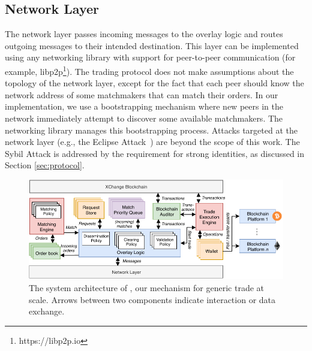 \subsection{Network Layer}
\label{subsec:network_layer}
The network layer passes incoming messages to the overlay logic and routes outgoing messages to their intended destination.
This layer can be implemented using any networking library with support for peer-to-peer communication (for example, libp2p\footnote{https://libp2p.io}).
The \ModelName{} trading protocol does not make assumptions about the topology of the network layer, except for the fact that each peer should know the network address of some matchmakers that can match their orders.
In our implementation, we use a bootstrapping mechanism where new peers in the network immediately attempt to discover some available matchmakers.
The networking library manages this bootstrapping process.
Attacks targeted at the network layer (e.g., the Eclipse Attack~\cite{singh2006eclipse}) are beyond the scope of this work.
The Sybil Attack is addressed by the requirement for strong identities, as discussed in Section \ref{sec:protocol}.

\begin{figure}[t]
	\centering
	\includegraphics[width=\linewidth]{xchange/assets/xchange_architecture}
	\caption{The system architecture of \ModelName{}, our mechanism for generic trade at scale. Arrows between two components indicate interaction or data exchange.}
	\label{fig:mechanism_architecture}
\end{figure}


